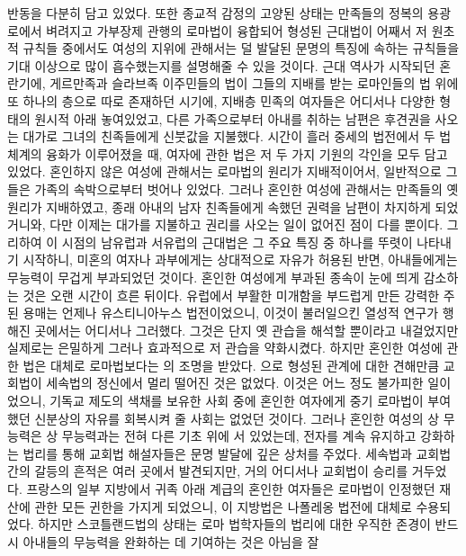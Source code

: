 반동을 다분히 담고 있었다.
또한 종교적 감정의 고양된 상태는
만족들의 정복의 용광로에서 벼려지고
가부장제 관행의 로마법이 융합되어 형성된
근대법이
어째서
저 원초적 규칙들 중에서도
여성의 지위에 관해서는
덜 발달된 문명의 특징에 속하는 규칙들을 기대 이상으로 많이 흡수했는지를
설명해줄 수 있을 것이다.
근대 역사가 시작되던 혼란기에,
게르만족과 슬라브족 이주민들의 법이
그들의 지배를 받는 로마인들의 법 위에 또 하나의 층으로 따로 존재하던 시기에,
지배층 민족의 여자들은 어디서나
다양한 형태의 원시적  아래 놓여있었고,
다른 가족으로부터 아내를 취하는 남편은
후견권을 사오는 대가로
그녀의 친족들에게
신붓값을 지불했다.
시간이 흘러 중세의 법전에서 두 법체계의 융화가 이루어졌을 때,
여자에 관한 법은 저 두 가지 기원의 각인을 모두 담고 있었다.
혼인하지 않은 여성에 관해서는
로마법의 원리가
지배적이어서,
일반적으로 
그들은 가족의 속박으로부터 벗어나 있었다.
그러나
혼인한 여성에 관해서는
만족들의 옛 원리가 지배하였고,
종래 아내의 남자 친족들에게 속했던 권력을 남편이 차지하게 되었거니와,
다만 이제는 대가를 지불하고 권리를 사오는 일이 없어진 점이 다를 뿐이다.
그리하여 이 시점의 남유럽과 서유럽의 근대법은 그 주요 특징 중 하나를
뚜렷이 나타내기 시작하니,
미혼의 여자나 과부에게는 상대적으로 자유가 허용된 반면,
아내들에게는 무능력이 무겁게 부과되었던 것이다.
혼인한 여성에게 부과된 종속이 눈에 띄게 감소하는 것은 오랜 시간이 흐른 뒤이다.
유럽에서 부활한 미개함을 부드럽게 만든 강력한 주된 용매는
언제나 유스티니아누스 법전이었으니,
이것이 불러일으킨 열성적 연구가 행해진 곳에서는 어디서나 그러했다.
그것은
단지 옛 관습을 해석할 뿐이라고 내걸었지만 실제로는
은밀하게 그러나 효과적으로 저 관습을 약화시켰다.
하지만 혼인한 여성에 관한 법은 대체로 로마법보다는 의 조명을 받았다.
으로 형성된 관계에 대한 견해만큼
교회법이
세속법의 정신에서
멀리 떨어진 것은 없었다.
이것은 어느 정도 불가피한 일이었으니,
기독교 제도의 색채를 보유한 사회 중에
혼인한 여자에게 중기 로마법이 부여했던 신분상의 자유를 회복시켜 줄 사회는
없었던 것이다.
그러나 혼인한 여성의 상 무능력은 상 무능력과는 전혀 다른
기초 위에 서 있었는데,
전자를 계속 유지하고 강화하는 법리를 통해
교회법 해설자들은 문명 발달에 깊은 상처를 주었다.
세속법과 교회법 간의 갈등의 흔적은 여러 곳에서 발견되지만,
거의 어디서나 교회법이 승리를 거두었다.
프랑스의 일부 지방에서
귀족 아래 계급의 혼인한 여자들은
로마법이 인정했던 재산에 관한 모든 귄한을 가지게 되었으니,
이 지방법은 나폴레옹 법전에 대체로 수용되었다.
하지만 스코틀랜드법의 상태는
로마 법학자들의 법리에 대한 우직한 존경이
반드시 아내들의 무능력을 완화하는 데 기여하는 것은 아님을 잘
